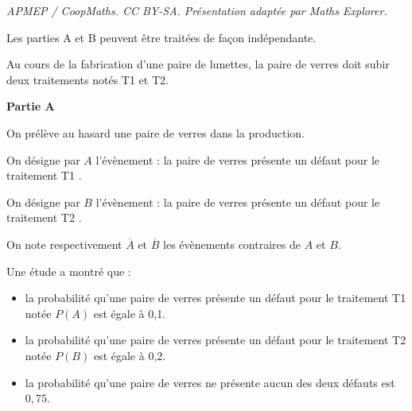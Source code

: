 \documentclass[10pt]{article}
\begin{document}
\noindent\textit{APMEP / CoopMaths. CC BY-SA. Présentation adaptée par Maths Explorer.}\par\medskip
\bigskip

Les parties A et B peuvent être traitées de façon indépendante.

\medskip

Au cours de la fabrication d'une paire de lunettes, la paire de verres doit subir deux traitements notés T1 et T2.

\bigskip

\textbf{Partie A}

\medskip

On prélève au hasard une paire de verres dans la production.

On désigne par $A$ l'évènement : \og la paire de verres présente un défaut pour le traitement T1 \fg.

On désigne par $B$ l'évènement : \og la paire de verres présente un défaut pour le traitement T2 \fg.

On note respectivement $\overline{A}$ et $\overline{B}$ les évènements contraires de $A$ et $B$.

Une étude a montré que :

\begin{itemize}
\item la probabilité qu'une paire de verres présente un défaut pour le traitement T1 notée $P(A)$ est égale à 0,1.
\item la probabilité qu'une paire de verres présente un défaut pour le traitement T2 notée $P(B)$ est égale à 0,2.
\item la probabilité qu'une paire de verres ne présente aucun des deux défauts est $0,75$.
\end{itemize}

\medskip
\end{document}
